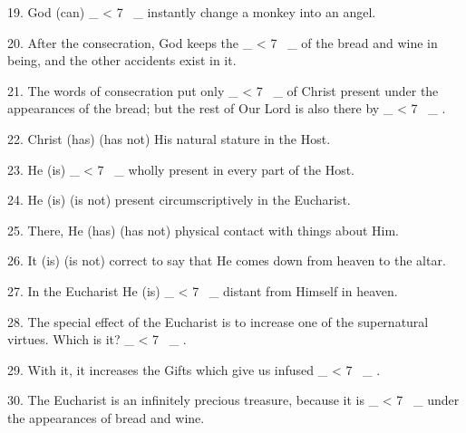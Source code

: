 \documentclass[a5paper]{article}
\newcounter{z}
\newcommand\spaces[1]{ \_\loop \ifnum\value{z} < #1
~\_%
\stepcounter{z}%
\repeat%
\setcounter{z}{0}}
\begin{document}
19. God (can) \spaces{7}  instantly  change  a
monkey into an angel. 

20. After the consecration, God keeps the \spaces{7}  of
the bread and wine in being, and the other accidents exist in  it.  

21.  The
words of  consecration  put  only  \spaces{7}  of  Christ  present  under  the
appearances of the bread; but  the  rest  of  Our  Lord  is  also  there  by
\spaces{7}. 

22. Christ (has) (has not) His natural stature in  the  Host. 

23. 
He (is) \spaces{7} wholly present in every part of the Host. 

24. He  (is)  (is
not) present circumscriptively in the Eucharist. 

25. There,  He  (has)  (has
not) physical contact with things about Him. 

26. It (is)  (is  not)  correct
to say that He comes down from heaven to the altar. 

27. In the Eucharist  He
(is) \spaces{7} distant from Himself in heaven. 

28. The special effect of  the
Eucharist is to increase one of  the  supernatural  virtues.  Which  is  it?
\spaces{7}. 

29. With  it,  it  increases  the  Gifts  which  give  us  infused
\spaces{7}. 

30. The Eucharist is an infinitely precious treasure,  because  it
is \spaces{7} under the appearances of bread and wine.

\newpage
\end{document}
